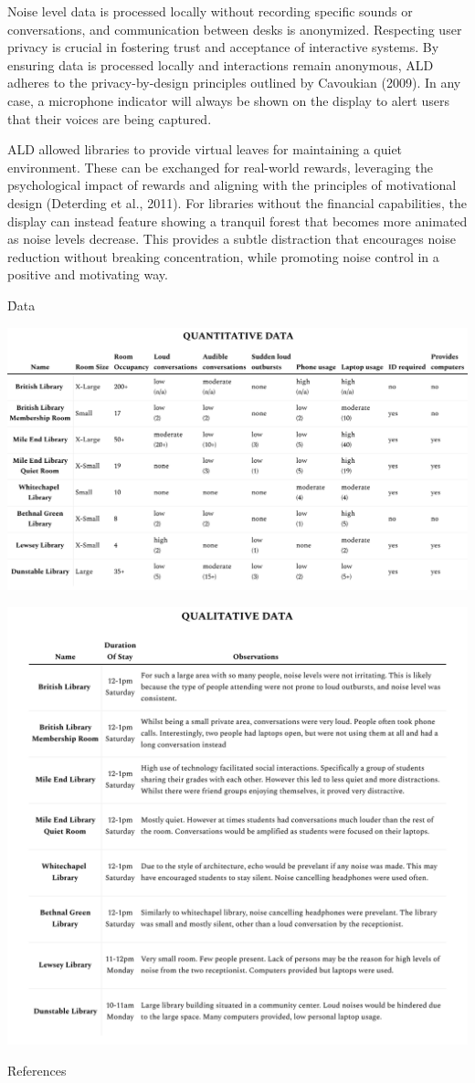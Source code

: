 \documentclass{novel}
\begin{document}
Noise level data is processed locally without recording specific sounds or conversations, and communication between desks is anonymized. Respecting user privacy is crucial in fostering trust and acceptance of interactive systems. By ensuring data is processed locally and interactions remain anonymous, ALD adheres to the privacy-by-design principles outlined by Cavoukian (2009). In any case, a microphone indicator will always be shown on the display to alert users that their voices are being captured.

ALD allowed libraries to provide virtual leaves for maintaining a quiet environment. These can be exchanged for real-world rewards, leveraging the psychological impact of rewards and aligning with the principles of motivational design (Deterding et al., 2011). For libraries without the financial capabilities, the display can instead feature showing a tranquil forest that becomes more animated as noise levels decrease. This provides a subtle distraction that encourages noise reduction without breaking concentration, while promoting noise control in a positive and motivating way.

\h{Data}
\begin{adjustwidth}{-2cm}{-2cm}
    \centering
\includegraphics[width=\dimexpr\paperwidth-4cm\relax]{resources/nData.pdf}
\end{adjustwidth}

\begin{adjustwidth}{-2cm}{-2cm}
    \centering
\includegraphics[width=\dimexpr\paperwidth-4cm\relax]{resources/lData.pdf}
\end{adjustwidth}

\h{References}
\end{document}
